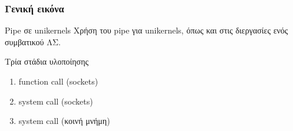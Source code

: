 \documentclass[red,slidestop,notes,compress,mathserif]{beamer}
\begin{document}
\begin{frame}
\frametitle{Γενική εικόνα}
\begin{block}{Pipe σε unikernels}
Χρήση του pipe για unikernels, όπως και στις διεργασίες ενός συμβατικού ΛΣ.
\end{block}
\begin{block}{Τρία στάδια υλοποίησης}
\begin{enumerate}
\item function call (sockets)
\item system call (sockets)
\item system call (κοινή μνήμη)
\end{enumerate}
\end{block}
\end{frame}

\end{document}
